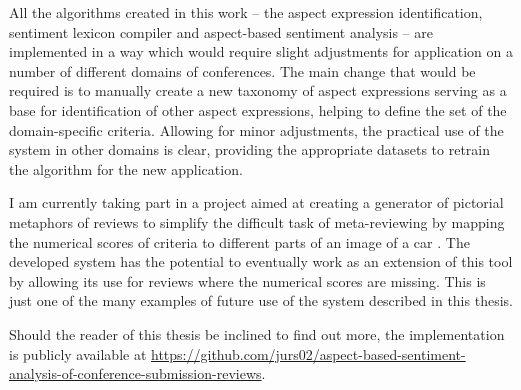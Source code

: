 All the algorithms created in this work -- the aspect expression identification, sentiment lexicon compiler and aspect-based sentiment analysis -- are implemented in a way which would require slight adjustments for application on a number of different domains of conferences. The main change that would be required is to manually create a new taxonomy of aspect expressions serving as a base for identification of other aspect expressions, helping to define the set of the domain-specific criteria. Allowing for minor adjustments, the practical use of the system in other domains is clear,  providing the appropriate datasets to retrain the algorithm for the new application.

I am currently taking part in a project aimed at creating a generator of pictorial metaphors of reviews to simplify the difficult task of meta-reviewing by mapping the numerical scores of criteria to different parts of an image of a car \cite{pictoreview_iswc}. The developed system has the potential to eventually work as an extension of this tool by allowing its use for reviews where the numerical scores are missing. This is just one of the many examples of future use of the system described in this thesis.

\sloppy
Should the reader of this thesis be inclined to find out more,
the implementation is publicly available at \url{https://github.com/jurs02/aspect-based-sentiment-analysis-of-conference-submission-reviews}.

\fussy



